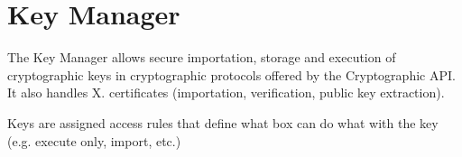 \hypertarget{group__ssbx___key_management}{}\section{Key Manager}
\label{group__ssbx___key_management}
The Key Manager allows secure importation, storage and execution of cryptographic keys in cryptographic protocols offered by the Cryptographic A\+PI. It also handles X. certificates (importation, verification, public key extraction).

Keys are assigned access rules that define what box can do what with the key (e.\+g. execute only, import, etc.) 